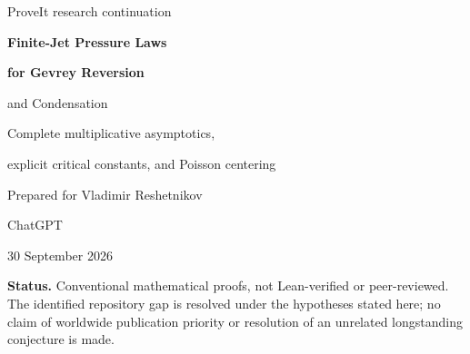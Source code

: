 \documentclass[11pt,a4paper]{article}
\theoremstyle{definition}
\theoremstyle{remark}
\numberwithin{equation}{section}
\begin{document}
\hypersetup{pageanchor=false}
\begin{titlepage}
\vspace*{10mm}
{\color{MidnightBlue}\Large ProveIt research continuation\par}
\vspace{11mm}
{\Huge\bfseries Finite-Jet Pressure Laws\par}
\vspace{3mm}
{\huge\bfseries for Gevrey Reversion\par and Condensation\par}
\vspace{9mm}
{\Large Complete multiplicative asymptotics,\par explicit critical constants, and Poisson centering\par}
\vspace{11mm}
{\large Prepared for Vladimir Reshetnikov\par}
{\large ChatGPT\par}
{30 September 2026\par}
\vspace{9mm}
\begin{abstract}
The ProveIt research corpus leaves a precise gap in its sharp
fixed-coefficient-ball analysis of formal reversion: at Gevrey orders
$0<s<1/2$, the leading logarithmic amplification is known, but a
multiplicative equivalent is not supplied. We close that gap for the
stated factorial weights and, more generally, for positive weights with
an eventually shifted-factorial tail and an arbitrary finite head.
The logarithm of the normalized extremal inverse coefficient is a finite
sum $\sum_{ks\le1}p_k n^{1-ks}+o(1)$, with an explicit coefficient
extraction formula for every $p_k$. Thus every positive order, including
all reciprocal-integer transition points, has a complete multiplicative
equivalent.

A parameter $\theta\ge-1$ puts the reversion extremum ($\theta=1$) and
superexponentially weighted plane trees ($\theta=-1$) into one theorem.
The proof reduces an exact Lagrange sum to finitely many small-part
sizes and evaluates it by a Poisson change of measure. It gives a
finite-head universality law, all critical windows
$s=1/r+t/\log n$, and explicit all-order centering parameters for the
asymptotically independent small-part counts. Exact algebraic checks and
non-certified numerical diagnostics accompany the proofs.
\end{abstract}
\vfill
\small
\textbf{Status.} Conventional mathematical proofs, not Lean-verified or
peer-reviewed. The identified repository gap is resolved under the
hypotheses stated here; no claim of worldwide publication priority or
resolution of an unrelated longstanding conjecture is made.
\end{titlepage}
\hypersetup{pageanchor=true}
\setcounter{tocdepth}{1}
\tableofcontents
\clearpage
\end{document}
